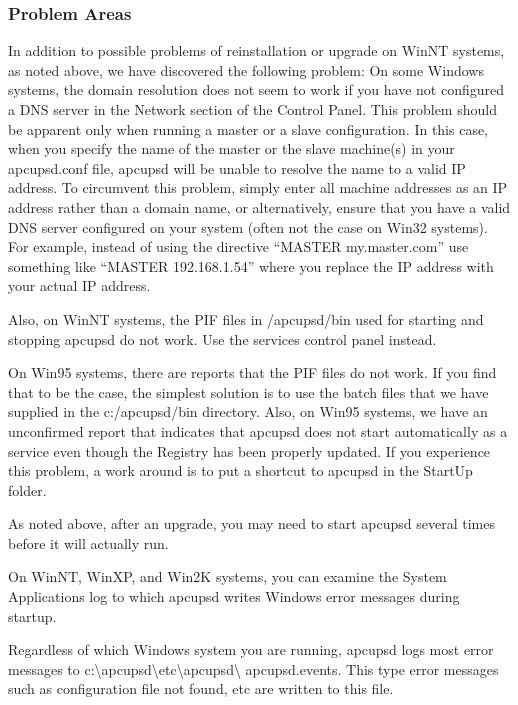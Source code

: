 {{{{{{{{{{\label{Problem-Areas}

\subsubsection*{Problem Areas}

\label{index-Problems_002c-Windows-178}
\label{index-Windows_002c-Problems-179}
In addition to possible problems of reinstallation or upgrade on WinNT
systems, as noted above, we have discovered the following problem: On some
Windows systems, the domain resolution does not seem to work if you have not
configured a DNS server in the Network section of the Control Panel. This
problem should be apparent only when running a master or a slave
configuration. In this case, when you specify the name of the master or the
slave machine(s) in your apcupsd.conf file, apcupsd will be unable to resolve
the name to a valid IP address. To circumvent this problem, simply enter all
machine addresses as an IP address rather than a domain name, or
alternatively, ensure that you have a valid DNS server configured on your
system (often not the case on Win32 systems).  For example, instead of using
the directive ``MASTER my.master.com'' use something like ``MASTER
192.168.1.54'' where you replace the IP address with your actual IP address.  

Also, on WinNT systems, the PIF files in /apcupsd/bin used for starting and
stopping apcupsd do not work. Use the services control panel instead.  

On Win95 systems, there are reports that the PIF files do not work. If you
find that to be the case, the simplest solution is to use the batch files that
we have supplied in the c:/apcupsd/bin directory. Also, on Win95 systems, we
have an unconfirmed report that indicates that apcupsd does not start
automatically as a service even though the Registry has been properly updated.
If you experience this problem, a work around is to put a shortcut to apcupsd
in the StartUp folder.  

As noted above, after an upgrade, you may need to start apcupsd several times
before it will actually run.  

On WinNT, WinXP, and Win2K systems, you can examine the System Applications
log to which apcupsd writes Windows error messages during startup.  

Regardless of which Windows system you are running, apcupsd logs most error
messages to
c:\textbackslash{}apcupsd\textbackslash{}etc\textbackslash{}apcupsd\textbackslash
{}apcupsd.events. This type error messages such as configuration file not
found, etc are written to this file. 

}}}}}}}}}}
